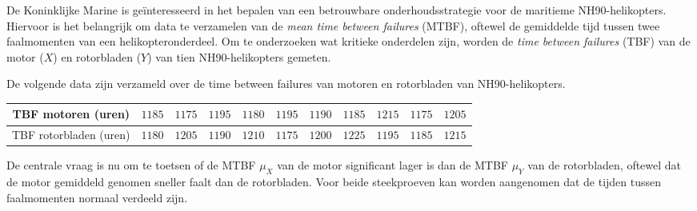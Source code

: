 \begin{question}{28}{
    De Koninklijke Marine is geïnteresseerd in het bepalen van een betrouwbare onderhoudsstrategie voor de maritieme NH90-helikopters.
    Hiervoor is het belangrijk om data te verzamelen van de \emph{mean time between failures} (MTBF), oftewel de gemiddelde tijd tussen twee faalmomenten van een helikopteronderdeel.
    Om te onderzoeken wat kritieke onderdelen zijn, worden de \emph{time between failures} (TBF) van de motor ($X$) en rotorbladen ($Y$) van tien NH90-helikopters gemeten.

    De volgende data zijn verzameld over de time between failures van motoren en rotorbladen van NH90-helikopters.
    
    \begin{center}
        \begin{tabular}{c|cccccccccc}
            \toprule
                TBF motoren (uren) & $1185$ & $1175$ & $1195$ & $1180$ & $1195$ & $1190$ & $1185$ & $1215$ & $1175$ & $1205$ \\ 
            \midrule
                TBF rotorbladen (uren) & $1180$ & $1205$ & $1190$ & $1210$ & $1175$ & $1200$ & $1225$ & $1195$ & $1185$ & $1215$ \\
            \bottomrule
        \end{tabular}
    \end{center}
    \vspace{1em}

    De centrale vraag is nu om te toetsen of de MTBF $\mu_X$ van de motor significant lager is dan de MTBF $\mu_Y$ van de rotorbladen, oftewel dat de motor gemiddeld genomen sneller faalt dan de rotorbladen.
    Voor beide steekproeven kan worden aangenomen dat de tijden tussen faalmomenten normaal verdeeld zijn.
}

\end{question}
